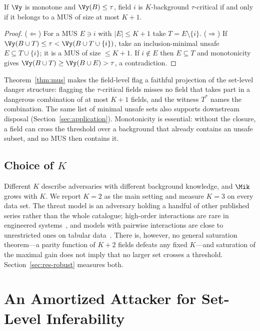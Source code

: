 \begin{theorem}\label{thm:mus}
If $\Vy$ is monotone and $\Vy(B)\le\tau$, field $i$ is $K$-background $\tau$-critical if and
only if it belongs to a MUS of size at most $K+1$.
\end{theorem}
\begin{proof}
($\Leftarrow$) For a MUS $E\ni i$ with $|E|\le K+1$ take $T=E\setminus\{i\}$.
($\Rightarrow$) If $\Vy(B\cup T)\le\tau<\Vy(B\cup T\cup\{i\})$, take an inclusion-minimal unsafe
$E\subseteq T\cup\{i\}$; it is a MUS of size $\le K+1$. If $i\notin E$ then $E\subseteq T$ and
monotonicity gives $\Vy(B\cup T)\ge\Vy(B\cup E)>\tau$, a contradiction.
\end{proof}
Theorem~\ref{thm:mus} makes the field-level flag a faithful projection of the set-level
danger structure: flagging the $\tau$-critical fields misses no field that takes part in a
dangerous combination of at most $K+1$ fields, and the witness $T^*$ names the combination.
The same list of minimal unsafe sets also supports downstream disposal
(Section~\ref{sec:application}).
Monotonicity is essential: without the closure, a field can cross the threshold over a
background that already contains an unsafe subset, and no MUS then contains it.


\subsection{Choice of $K$}
Different $K$ describe adversaries with different background knowledge, and $\Mik$ grows with $K$.
We report $K=2$ as the main setting and measure $K=3$ on every data set. The threat model is an
adversary holding a handful of other published series rather than the whole catalogue;
high-order interactions are rare in engineered systems~\cite{li2006regularities}, and models with
pairwise interactions are close to unrestricted ones on tabular data~\cite{lou2013ga2m}. There is,
however, no general saturation theorem---a parity function of $K+2$ fields defeats any fixed
$K$---and saturation of the maximal gain does not imply that no larger set crosses a threshold.
Section~\ref{sec:res-robust} measures both.

\section{An Amortized Attacker for Set-Level Inferability}\label{sec:model}

